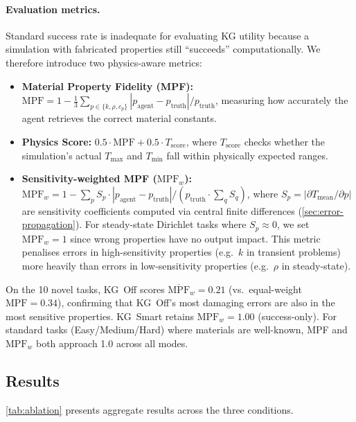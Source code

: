 \documentclass[preprint,review,12pt]{elsarticle}
\begin{document}
\paragraph{Evaluation metrics.}
Standard success rate is inadequate for evaluating KG utility because
a simulation with fabricated properties still ``succeeds''
computationally.  We therefore introduce two physics-aware metrics:
\begin{itemize}
  \item \textbf{Material Property Fidelity (MPF):}
        $\text{MPF} = 1 - \frac{1}{3}\sum_{p \in \{k,\rho,c_p\}}
        |p_\text{agent} - p_\text{truth}| / p_\text{truth}$, measuring
        how accurately the agent retrieves the correct material constants.
  \item \textbf{Physics Score:} $0.5 \cdot \text{MPF} + 0.5 \cdot
        T_\text{score}$, where $T_\text{score}$ checks whether the
        simulation's actual $T_\text{max}$ and $T_\text{min}$ fall within
        physically expected ranges.
  \item \textbf{Sensitivity-weighted MPF ($\text{MPF}_w$):}
        $\text{MPF}_w = 1 - \sum_{p} S_p \cdot |p_\text{agent} -
        p_\text{truth}| / (p_\text{truth} \cdot \sum_q S_q)$, where
        $S_p = |\partial T_{\text{mean}} / \partial p|$ are sensitivity
        coefficients computed via central finite differences
        (\cref{sec:error-propagation}).
        For steady-state Dirichlet tasks where $S_p \approx 0$, we set
        $\text{MPF}_w{=}1$ since wrong properties have no output impact.
        This metric penalises errors in high-sensitivity properties
        (e.g.\ $k$ in transient problems) more heavily than errors in
        low-sensitivity properties (e.g.\ $\rho$ in steady-state).
\end{itemize}
On the 10 novel tasks, KG~Off scores $\overline{\text{MPF}}_w{=}0.21$
(vs.\ equal-weight $\text{MPF}{=}0.34$), confirming that KG~Off's most
damaging errors are also in the most sensitive properties.
KG~Smart retains $\text{MPF}_w{=}1.00$ (success-only).
For standard tasks (Easy/Medium/Hard) where materials are well-known,
MPF and $\text{MPF}_w$ both approach 1.0 across all modes.

\subsection{Results}

\cref{tab:ablation} presents aggregate results across the three
conditions.
\end{document}

